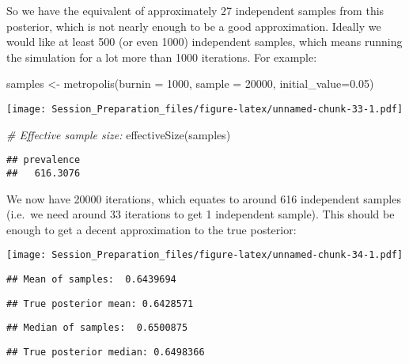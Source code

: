 \documentclass[
  12pt,
]{article}
\newenvironment{Shaded}{\begin{snugshade}}{\end{snugshade}}
\newcommand{\AttributeTok}[1]{\textcolor[rgb]{0.77,0.63,0.00}{#1}}
\newcommand{\CommentTok}[1]{\textcolor[rgb]{0.56,0.35,0.01}{\textit{#1}}}
\newcommand{\DecValTok}[1]{\textcolor[rgb]{0.00,0.00,0.81}{#1}}
\newcommand{\FloatTok}[1]{\textcolor[rgb]{0.00,0.00,0.81}{#1}}
\newcommand{\FunctionTok}[1]{\textcolor[rgb]{0.00,0.00,0.00}{#1}}
\newcommand{\NormalTok}[1]{#1}
\newcommand{\OtherTok}[1]{\textcolor[rgb]{0.56,0.35,0.01}{#1}}
\begin{document}
So we have the equivalent of approximately 27 independent samples from
this posterior, which is not nearly enough to be a good approximation.
Ideally we would like at least 500 (or even 1000) independent samples,
which means running the simulation for a lot more than 1000 iterations.
For example:

\begin{Shaded}
\begin{Highlighting}[]
\NormalTok{samples }\OtherTok{\textless{}{-}} \FunctionTok{metropolis}\NormalTok{(}\AttributeTok{burnin =} \DecValTok{1000}\NormalTok{, }\AttributeTok{sample =} \DecValTok{20000}\NormalTok{, }\AttributeTok{initial\_value=}\FloatTok{0.05}\NormalTok{)}
\end{Highlighting}
\end{Shaded}

\texttt{[image: Session\_Preparation\_files/figure-latex/unnamed-chunk-33-1.pdf]}

\begin{Shaded}
\begin{Highlighting}[]
\CommentTok{\# Effective sample size:}
\FunctionTok{effectiveSize}\NormalTok{(samples)}
\end{Highlighting}
\end{Shaded}

\begin{verbatim}
## prevalence 
##   616.3076
\end{verbatim}

We now have 20000 iterations, which equates to around 616 independent
samples (i.e.~we need around 33 iterations to get 1 independent sample).
This should be enough to get a decent approximation to the true
posterior:

\texttt{[image: Session\_Preparation\_files/figure-latex/unnamed-chunk-34-1.pdf]}

\begin{verbatim}
## Mean of samples:  0.6439694
\end{verbatim}

\begin{verbatim}
## True posterior mean: 0.6428571
\end{verbatim}

\begin{verbatim}
## Median of samples:  0.6500875
\end{verbatim}

\begin{verbatim}
## True posterior median: 0.6498366
\end{verbatim}
\end{document}
